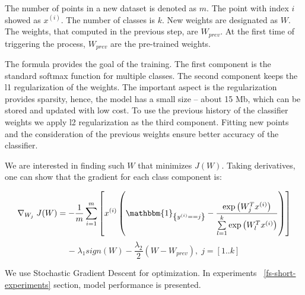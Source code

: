 The number of points in a new dataset is denoted as $m$. The point with index $i$ showed as $x^{(i)}$. The number of classes is $k$. New weights are designated as $W$. The weights, that computed in the previous step, are $W_{prev}$. At the first time of triggering the process, $W_{prev}$ are the pre-trained weights. 

The formula provides the goal of the training. The first component is the standard softmax function for multiple classes. The second component keeps the l1 regularization of the weights. The important aspect is the regularization provides sparsity, hence, the model has a small size -- about 15 Mb, which can be stored and updated with low cost. To use the previous history of the classifier weights we apply l2 regularization as the third component. Fitting new points and the consideration of the previous weights ensure better accuracy of the classifier.

We are interested in finding such $W$ that minimizes $J(W)$. Taking derivatives, one can show that the gradient for each class component is:

\begin{center}

$$ \nabla_{W_j} \; J(W) = -\frac{1}{m} \sum \limits_{i = 1}^{m} \left[ x^{(i)} \left( \mathbbm{1}_{\left\{y^{(i)} == j\right\} } - \frac{\exp\left({W_{j}^Tx^{(i)}}\right)}{\sum \limits_{l = 1}^{k}  \exp\left({W_{l}^Tx^{(i)}}\right)} \right) \right] $$
$$ - \; \lambda_1 sign\left(W\right) - \frac{\lambda_2}{2} \left(W - W_{prev} \right), \; j = [1..k] $$

\end{center} 

We use Stochastic Gradient Descent for optimization. In experiments ~\ref{fs-short-experiments} section, model performance is presented.
